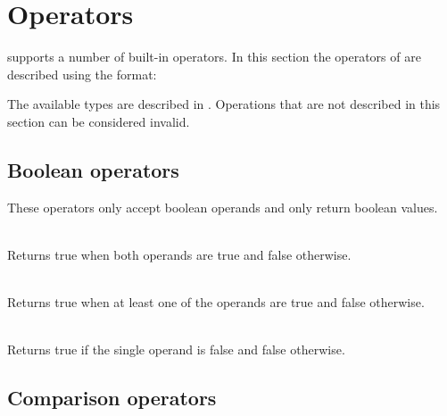 \section{Operators}

\productname{} supports a number of built-in operators. In this section the operators
of \productname{} are described using the format:


The available types are described in .
Operations that are not described in this section can be considered invalid.

\subsection{Boolean operators}

These operators only accept boolean operands and only return boolean values.
\begin{dlist}
  \item {}\\
    Returns true when both operands are true and false otherwise. 
  \item {}\\
    Returns true when at least one of the operands are true and false otherwise.
  \item {}\\
    Returns true if the single operand is false and false otherwise.
\end{dlist}

\subsection{Comparison operators}


